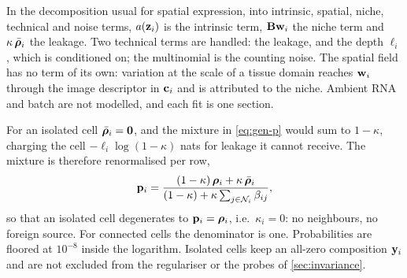 In the decomposition usual for spatial expression, into intrinsic, spatial, niche, technical and noise terms, $a(\mathbf{z}_i)$ is the intrinsic term, $\mathbf{B}\mathbf{w}_i$ the niche term and $\kappa\,\bar{\boldsymbol{\rho}}_i$ the leakage. Two technical terms are handled: the leakage, and the depth $\ell_i$, which is conditioned on; the multinomial is the counting noise. The spatial field has no term of its own: variation at the scale of a tissue domain reaches $\mathbf{w}_i$ through the image descriptor in $\mathbf{c}_i$ and is attributed to the niche. Ambient RNA and batch are not modelled, and each fit is one section.

 For an isolated cell $\bar{\boldsymbol{\rho}}_i = \mathbf{0}$, and the mixture in \cref{eq:gen-p} would sum to $1-\kappa$, charging the cell $-\ell_i\log(1-\kappa)$ nats for leakage it cannot receive. The mixture is therefore renormalised per row,
\begin{equation}
  \mathbf{p}_i = \frac{(1-\kappa)\,\boldsymbol{\rho}_i + \kappa\,\bar{\boldsymbol{\rho}}_i}{(1-\kappa) + \kappa\sum_{j \in \mathcal{N}_{i}}\beta_{ij}},
  \label{eq:renorm}
\end{equation}
so that an isolated cell degenerates to $\mathbf{p}_i = \boldsymbol{\rho}_i$, i.e.\ $\kappa_i = 0$: no neighbours, no foreign source. For connected cells the denominator is one. Probabilities are floored at $10^{-8}$ inside the logarithm. Isolated cells keep an all-zero composition $\mathbf{y}_i$ and are not excluded from the regulariser or the probes of \cref{sec:invariance}.

